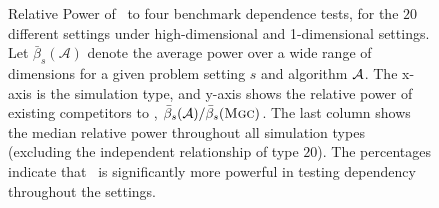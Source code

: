 \documentclass[11pt]{article}
\begin{document}
\begin{figure}[!ht]
\centering
{}
  \caption{Relative Power of  \Mgc~to four benchmark dependence tests, for the $20$ different settings under high-dimensional and 1-dimensional settings.  
Let $\bar{\beta}_s(\mathcal{A})$ denote the average power over a wide range of dimensions for a given problem setting $s$ and algorithm $\mathcal{A}$. The x-axis is the simulation type, and y-axis shows the relative power of existing competitors to \Mgc, $\bar{\beta}_s(\mathcal{A}) / \bar{\beta}_s({\normalfont\textsc{Mgc}})$. The last column shows the median relative power throughout all simulation types (excluding the independent relationship of type $20$). The percentages indicate that \Mgc~is significantly more powerful in testing dependency throughout the settings.
}
\label{f:Summary2}
\end{figure}
\end{document}
